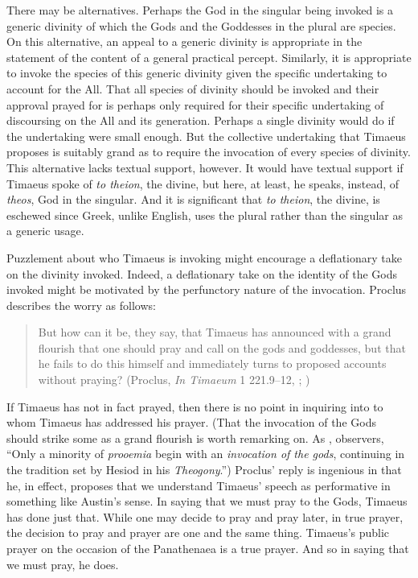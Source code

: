 There may be alternatives. Perhaps the God in the singular being invoked is a generic divinity of which the Gods and the Goddesses in the plural are species. On this alternative, an appeal to a generic divinity is appropriate in the statement of the content of a general practical percept. Similarly, it is appropriate to invoke the species of this generic divinity given the specific undertaking to account for the All. That all species of divinity should be invoked and their approval prayed for is perhaps only required for their specific undertaking of discoursing on the All and its generation. Perhaps a single divinity would do if the undertaking were small enough. But the collective undertaking that Timaeus proposes is suitably grand as to require the invocation of every species of divinity. This alternative lacks textual support, however. It would have textual support if Timaeus spoke of \emph{to theion}, the divine, but here, at least, he speaks, instead, of \emph{theos}, God in the singular. And it is significant that \emph{to theion}, the divine, is eschewed since Greek, unlike English, uses the plural rather than the singular as a generic usage.

Puzzlement about who Timaeus is invoking might encourage a deflationary take on the divinity invoked. Indeed, a deflationary take on the identity of the Gods invoked might be motivated by the perfunctory nature of the invocation. Proclus describes the worry as follows:
\begin{quote}
	But how can it be, they say, that Timaeus has announced with a grand flourish that one should pray and call on the gods and goddesses, but that he fails to do this himself and immediately turns to proposed accounts without praying? (Proclus, \emph{In Timaeum} 1 221.9--12, \citealt{Diehl:1903re}; \citealt[58]{Runia:2008aa})
\end{quote}
If Timaeus has not in fact prayed, then there is no point in inquiring into to whom Timaeus has addressed his prayer. (That the invocation of the Gods should strike some as a grand flourish is worth remarking on. As \citealt[104]{Runia:1997vz}, observers, ``Only a minority of \emph{prooemia} begin with an \emph{invocation of the gods}, continuing in the tradition set by Hesiod in his \emph{Theogony}.'') Proclus' reply is ingenious in that he, in effect, proposes that we understand Timaeus' speech as performative in something like Austin's \citeyearpar{Austin:1975nx} sense. In saying that we must pray to the Gods, Timaeus has done just that. While one may decide to pray and pray later, in true prayer, the decision to pray and prayer are one and the same thing. Timaeus's public prayer on the occasion of the Panathenaea is a true prayer. And so in saying that we must pray, he does.

